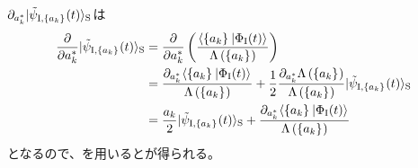 \documentclass[10pt, a4paper]{jsarticle}
\begin{document}
$\partial_{a_{k}^{*}} | \tilde{\psi}_{{\rm I}, \left\{ a_{k} \right\}_{}}(t) \rangle_{\rm S}$は
\begin{equation}
\begin{split}
\label{eq:514}
	\dfrac{\partial}{\partial a_{k}^{*}} | \tilde{\psi}_{{\rm I}, \left\{ a_{k} \right\}_{}}(t) \rangle_{\rm S} &= \dfrac{\partial}{\partial a_{k}^{*}}  \left( \dfrac{{}_{\rm }\langle \left\{ a_{k} \right\}_{} | \Phi_{\rm I}(t) \rangle_{\rm }}{\Lambda \left( \left\{ a_{k} \right\}_{} \right)} \right) \\
		&= \dfrac{\partial_{a_{k}^{*}} {}_{\rm }\langle \left\{ a_{k} \right\}_{} | \Phi_{\rm I}(t) \rangle_{\rm }}{\Lambda \left( \left\{ a_{k} \right\}_{} \right)} + \dfrac{1}{2} \dfrac{\partial_{a_{k}^{*}} \Lambda \left( \left\{ a_{k} \right\}_{} \right)}{\Lambda \left( \left\{ a_{k} \right\}_{} \right)} | \tilde{\psi}_{{\rm I}, \left\{ a_{k} \right\}_{}}(t) \rangle_{\rm S} \\
		&= \dfrac{a_{k}}{2} | \tilde{\psi}_{{\rm I}, \left\{ a_{k} \right\}_{}}(t) \rangle_{\rm S} + \dfrac{\partial_{a_{k}^{*}} {}_{\rm }\langle \left\{ a_{k} \right\}_{} | \Phi_{\rm I}(t) \rangle_{\rm }}{\Lambda \left( \left\{ a_{k} \right\}_{} \right)}
\end{split}
\end{equation}
となるので、を用いるとが得られる。
\end{document}
